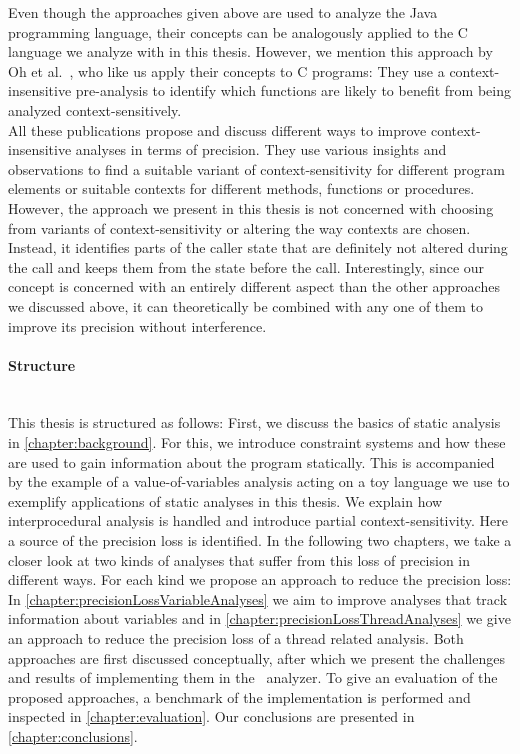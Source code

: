 Even though the approaches given above are used to analyze the Java programming language, their concepts can be analogously applied to the C language we analyze with \gob in this thesis. However, we mention this approach by Oh et al.~\parencite{oh2014selective}, who like us apply their concepts to C programs: They use a context-insensitive pre-analysis to identify which functions are likely to benefit from being analyzed context-sensitively.\\
All these publications propose and discuss different ways to improve context-insensitive analyses in terms of precision. They use various insights and observations to find a suitable variant of context-sensitivity for different program elements or suitable contexts for different methods, functions or procedures. However, the approach we present in this thesis is not concerned with choosing from variants of context-sensitivity or altering the way contexts are chosen. Instead, it identifies parts of the caller state that are definitely not altered during the call and keeps them from the state before the call. Interestingly, since our concept is concerned with an entirely different aspect than the other approaches we discussed above, it can theoretically be combined with any one of them to improve its precision without interference.

\paragraph{Structure}\mbox{}\\
This thesis is structured as follows: First, we discuss the basics of static analysis in \autoref{chapter:background}. For this, we introduce constraint systems and how these are used to gain information about the program statically. This is accompanied by the example of a value-of-variables analysis acting on a toy language we use to exemplify applications of static analyses in this thesis. We explain how interprocedural analysis is handled and introduce partial context-sensitivity. Here a source of the precision loss is identified. In the following two chapters, we take a closer look at two kinds of analyses that suffer from this loss of precision in different ways. For each kind we propose an approach to reduce the precision loss: In \autoref{chapter:precisionLossVariableAnalyses} we aim to improve analyses that track information about variables and in \autoref{chapter:precisionLossThreadAnalyses} we give an approach to reduce the precision loss of a thread related analysis. Both approaches are first discussed conceptually, after which we present the challenges and results of implementing them in the \gob\ analyzer. To give an evaluation of the proposed approaches, a benchmark of the implementation is performed and inspected in \autoref{chapter:evaluation}. Our conclusions are presented in \autoref{chapter:conclusions}.
